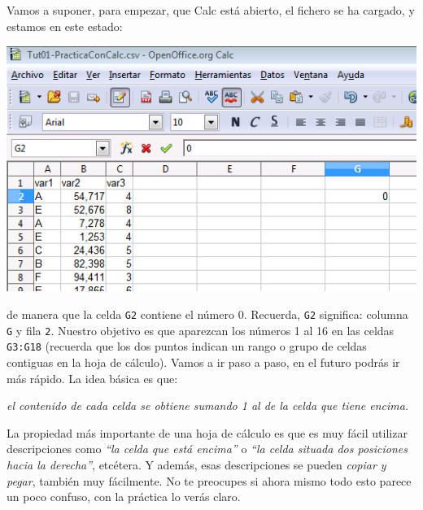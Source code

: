 \documentclass[10pt,a4paper]{article}\usepackage[]{graphicx}\usepackage[]{color}
\newcounter {cont01}
\begin{document}
Vamos a suponer, para empezar, que Calc está abierto, el fichero se ha cargado, y estamos en este estado:
    \begin{center}
    \includegraphics[height=8cm]{../fig/Tut01-Calc-Formula-00.png}
    \end{center}
de manera que la celda {\tt G2} contiene el número 0. Recuerda, {\tt G2} significa: columna {\tt G} y fila {\tt 2}. Nuestro objetivo es que aparezcan los números 1 al 16 en las celdas {\tt G3:G18} (recuerda que los dos puntos indican un {\sf rango} o grupo de celdas contiguas en la hoja de cálculo). Vamos a ir paso a paso, en el futuro podrás ir más rápido. La idea básica es que:
\begin{center}
{\em el contenido de cada celda se obtiene sumando 1 al de la celda que tiene encima.}
\end{center}
La propiedad más importante de una hoja de cálculo es que es muy fácil utilizar descripciones como {\em ``la celda que está encima''} o {\em ``la celda situada dos posiciones hacia la derecha''}, etcétera. Y además, esas descripciones se pueden {\em copiar y pegar}, también muy fácilmente. No te preocupes si ahora mismo todo esto parece un poco confuso, con la práctica lo verás claro.
\end{document}
